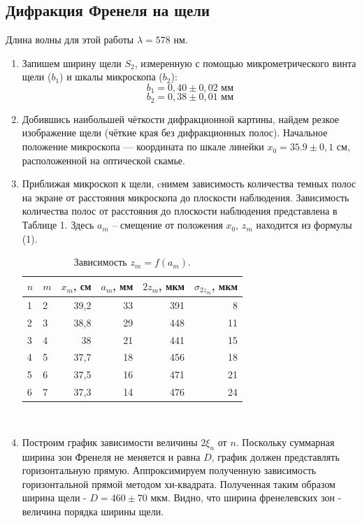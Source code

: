 \documentclass{article}
\begin{document}
\subsection{Дифракция Френеля на щели}
	Длина волны для этой работы $\lambda = 578$ нм.
\begin{enumerate}
\item Запишем ширину щели $S_2$, измеренную с помощью микрометрического винта щели ($b_1$) и шкалы микроскопа ($b_2$):
	\[
		b_1 = 0,40\pm0,02 \text{ мм}
	\]
	\[
		b_2 = 0,38\pm0,01 \text{ мм}
	\]
	
	
\item Добившись наибольшей чёткости дифракционной картины, найдем резкое изображение щели (чёткие края без дифракционных полос). Начальное положение микроскопа --- координата по шкале линейки $x_0 = 35.9\pm0,1 \text{ см}$, расположенной на оптической скамье. 
\item Приближая микроскоп к щели, cнимем зависимость количества темных полос на экране от расстояния микроскопа до плоскости наблюдения. Зависимость количества полос от расстояния до плоскости наблюдения представлена в Таблице 1. Здесь $a_m$ -- смещение от положения $x_0$, $z_m$ находится из формулы (1).

\begin{table}[h!]
{\begin{tabular}{|l|l|r|r|r|r|}
\hline
\textbf{$n$} & \textbf{$m$} & \multicolumn{1}{l|}{\textbf{$x_m$, см}} & \multicolumn{1}{l|}{\textbf{$a_m$, мм}} & \multicolumn{1}{l|}{\textbf{$2z_m$, мкм}} & \multicolumn{1}{l|}{\textbf{$\sigma_{2z_m}$, мкм}} \\ \hline
1 & 2 & 39,2 & 33 & 391 & 8 \\ \hline
2 & 3 & 38,8 & 29 & 448 & 11 \\ \hline
3 & 4 & 38 & 21 & 441 & 15 \\ \hline
4 & 5 & 37,7 & 18 & 456 & 18 \\ \hline
5 & 6 & 37,5 & 16 & 471 & 21 \\ \hline
6 & 7 & 37,3 & 14 & 476 & 24 \\ \hline
\end{tabular}%
}
\centering
\caption{Зависимость $z_m = f(a_m)$.}
\end{table}\\

\item Построим график зависимости величины $ 2\xi_n $  от $ n $. Поскольку суммарная ширина зон Френеля не меняется и равна $D$, график должен представлять горизонтальную прямую. Аппроксимируем полученную зависимость горизонтальной прямой методом хи-квадрата. Полученная таким образом ширина щели - $D = 460\pm 70$ мкм. Видно, что ширина френелевских зон - величина порядка ширины щели. 


\end{enumerate}
\end{document}
